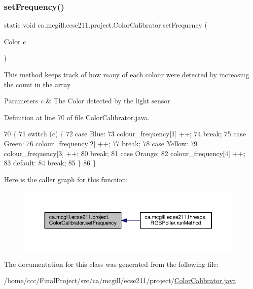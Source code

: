 \subsubsection{\texorpdfstring{set\+Frequency()}{setFrequency()}}
{\footnotesize\ttfamily static void ca.\+mcgill.\+ecse211.\+project.\+Color\+Calibrator.\+set\+Frequency (\begin{DoxyParamCaption}\item[{Color}]{c }\end{DoxyParamCaption})\hspace{0.3cm}{\ttfamily [static]}}

This method keeps track of how many of each colour were detected by increasing the count in the array 
\begin{DoxyParams}{Parameters}
{\em c} & The Color detected by the light sensor \\
\hline
\end{DoxyParams}


Definition at line 70 of file Color\+Calibrator.\+java.


\begin{DoxyCode}
70                                            \{
71     \textcolor{keywordflow}{switch} (c) \{
72       \textcolor{keywordflow}{case} Blue:
73         colour\_frequency[1] ++;
74         \textcolor{keywordflow}{break};
75       \textcolor{keywordflow}{case} Green:
76         colour\_frequency[2] ++;
77         \textcolor{keywordflow}{break};
78       \textcolor{keywordflow}{case} Yellow:
79         colour\_frequency[3] ++;
80         \textcolor{keywordflow}{break};
81       \textcolor{keywordflow}{case} Orange:
82         colour\_frequency[4] ++;
83       \textcolor{keywordflow}{default}:
84         \textcolor{keywordflow}{break};
85     \}
86   \}
\end{DoxyCode}
Here is the caller graph for this function\+:
\nopagebreak
\begin{figure}[H]
\begin{center}
\leavevmode
\includegraphics[width=350pt]{classca_1_1mcgill_1_1ecse211_1_1project_1_1_color_calibrator_a40906193773ead0bfd582f188413c97a_icgraph}
\end{center}
\end{figure}


The documentation for this class was generated from the following file\+:\begin{DoxyCompactItemize}
\item 
/home/ccc/\+Final\+Project/src/ca/mcgill/ecse211/project/\hyperlink{_color_calibrator_8java}{Color\+Calibrator.\+java}\end{DoxyCompactItemize}
